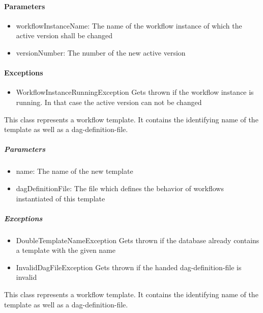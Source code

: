 \paragraph{Parameters}
\begin{itemize}
	\item{workflowInstanceName:}
	The name of the workflow instance of which the active version shall be changed
	\item{versionNumber:}
	The number of the new active version
\end{itemize}

\paragraph{Exceptions}
\begin{itemize}
	\item{WorkflowInstanceRunningException}
	Gets thrown if the workflow instance is running. In that case the active version can not be changed
\end{itemize}

This class represents a workflow template. It contains the identifying name of the template as well as a dag-definition-file.
\constructor


\subparagraph{Parameters}
\begin{itemize}
	\item{name:}
	The name of the new template
	\item{dagDefinitionFile:}
	The file which defines the behavior of workflows instantiated of this template
\end{itemize}

\subparagraph{Exceptions}
\begin{itemize}
	\item{DoubleTemplateNameException}
	Gets thrown if the database already contains a template with the given name
	\item{InvalidDagFileException}
	Gets thrown if the handed dag-definition-file is invalid
\end{itemize}


This class represents a workflow template. It contains the identifying name of the template as well as a dag-definition-file.
\constructor


